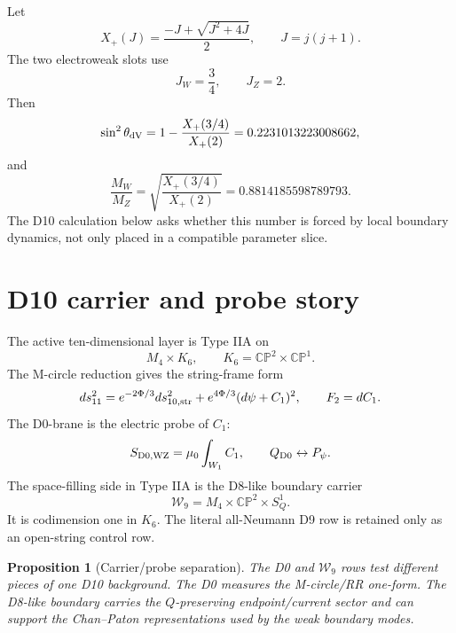 \documentclass[11pt]{article}
\newcommand{\CP}{\mathbb{CP}}
\newcommand{\WW}{\mathcal{W}}
\theoremstyle{plain}
\newtheorem{proposition}{Proposition}[section]
\theoremstyle{definition}
\begin{document}
Let
\begin{equation}
  X_+(J)=\frac{-J+\sqrt{J^2+4J}}{2},
  \qquad J=j(j+1).
  \label{eq:xplus}
\end{equation}
The two electroweak slots use
\begin{equation}
  J_W=\frac34,\qquad J_Z=2.
\end{equation}
Then
\begin{equation}
  \sin^2\theta_{\rm dV}
  =1-\frac{X_+(3/4)}{X_+(2)}
  =0.2231013223008662,
  \label{eq:dv-sin}
\end{equation}
and
\begin{equation}
  \frac{M_W}{M_Z}
  =\sqrt{\frac{X_+(3/4)}{X_+(2)}}
  =0.8814185598789793.
  \label{eq:dv-ratio}
\end{equation}
The D10 calculation below asks whether this number is forced by local boundary
dynamics, not only placed in a compatible parameter slice.

\section{D10 carrier and probe story}

The active ten-dimensional layer is Type IIA on
\begin{equation}
  M_4\times K_6,\qquad K_6=\CP^2\times\CP^1 .
  \label{eq:d10}
\end{equation}
The M-circle reduction gives the string-frame form
\begin{equation}
  ds_{11}^2=e^{-2\Phi/3}ds_{10,\rm str}^2
  +e^{4\Phi/3}(d\psi+C_1)^2,
  \qquad F_2=dC_1 .
  \label{eq:m-circle}
\end{equation}
The D0-brane is the electric probe of \(C_1\):
\begin{equation}
  S_{\rm D0,WZ}=\mu_0\int_{W_1}C_1,
  \qquad Q_{\rm D0}\leftrightarrow P_\psi .
  \label{eq:d0}
\end{equation}
The space-filling side in Type IIA is the D8-like boundary carrier
\begin{equation}
  \WW_9=M_4\times\CP^2\times S^1_Q.
  \label{eq:w9}
\end{equation}
It is codimension one in \(K_6\).  The literal all-Neumann D9 row is retained
only as an open-string control row.

\begin{proposition}[Carrier/probe separation]
The D0 and \(\WW_9\) rows test different pieces of one D10 background.  The
D0 measures the M-circle/RR one-form.  The D8-like boundary carries the
\(Q\)-preserving endpoint/current sector and can support the Chan--Paton
representations used by the weak boundary modes.
\end{proposition}
\end{document}
